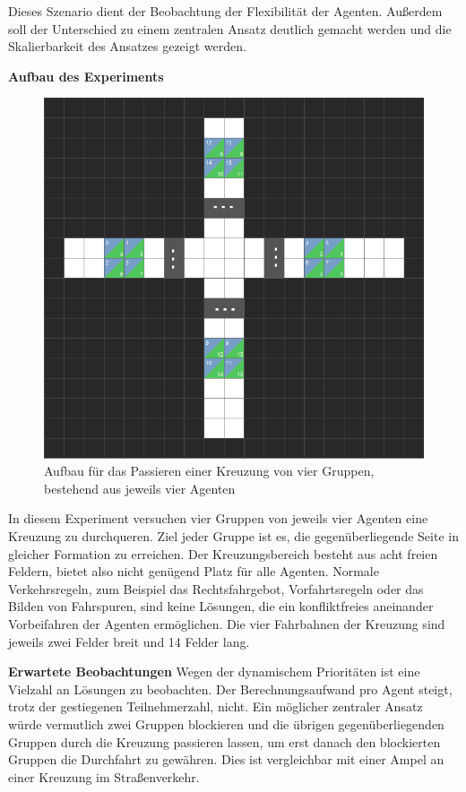 Dieses Szenario dient der Beobachtung der Flexibilität der Agenten. Außerdem soll der Unterschied zu einem zentralen Ansatz deutlich gemacht werden und die Skalierbarkeit des Ansatzes gezeigt werden.

\textbf{Aufbau des Experiments}
\begin{figure}[H]
    \includegraphics[width=\textwidth]{images/junction.png}
    \centering
    \caption{Aufbau für das Passieren einer Kreuzung von vier Gruppen, bestehend aus jeweils vier Agenten}
    \label{fig:kreuzung}
\end{figure}
In diesem Experiment versuchen vier Gruppen von jeweils vier Agenten eine Kreuzung zu durchqueren. Ziel jeder Gruppe ist es, die gegenüberliegende Seite in gleicher Formation zu erreichen. Der Kreuzungsbereich besteht aus acht freien Feldern, bietet also nicht genügend Platz für alle Agenten. Normale Verkehrsregeln, zum Beispiel das Rechtsfahrgebot, Vorfahrtsregeln oder das Bilden von Fahrspuren, sind keine Lösungen, die ein konfliktfreies aneinander Vorbeifahren der Agenten ermöglichen. Die vier Fahrbahnen der Kreuzung sind jeweils zwei Felder breit und 14 Felder lang.

\textbf{Erwartete Beobachtungen}\newline
Wegen der dynamischem Prioritäten ist eine Vielzahl an Lösungen zu beobachten. Der Berechnungsaufwand pro Agent steigt, trotz der gestiegenen Teilnehmerzahl, nicht.
Ein möglicher zentraler Ansatz würde vermutlich zwei Gruppen blockieren und die übrigen gegenüberliegenden Gruppen durch die Kreuzung passieren lassen, um erst danach den blockierten Gruppen die Durchfahrt zu gewähren. Dies ist vergleichbar mit einer Ampel an einer Kreuzung im Straßenverkehr.

